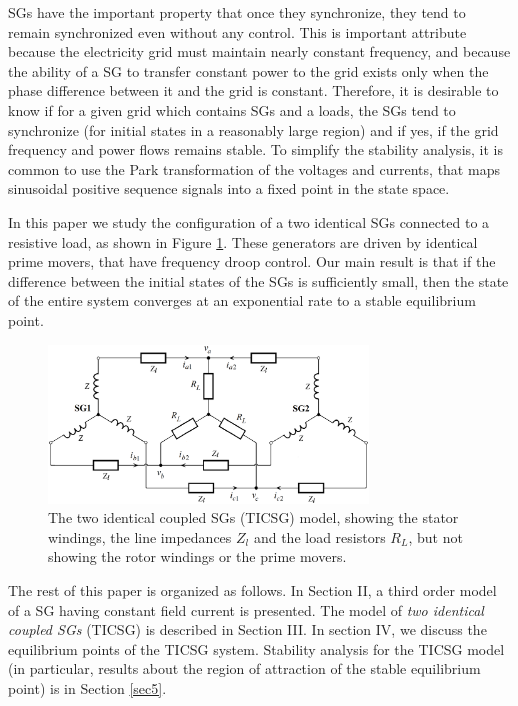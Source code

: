 \documentclass[letterpaper, 10 pt, conference]{ieeeconf}
\begin{document}
SGs have the important property that once they synchronize, they tend
to remain synchronized even without any control. This is important
attribute because the electricity grid must maintain nearly constant
frequency, and because the ability of a SG to transfer constant power
to the grid exists only when the phase difference between it and the
grid is constant. Therefore, it is desirable to know if for a given
grid which contains SGs and a loads, the SGs tend to synchronize (for
initial states in a reasonably large region) and if yes, if the grid
frequency and power flows remains stable. To simplify the stability
analysis, it is common to use the Park transformation of the voltages
and currents, that maps sinusoidal positive sequence signals into a
fixed point in the state space.

In this paper we study the configuration of a two identical SGs
connected to a resistive load, as shown in Figure
\ref{fig:TICSGThreePhase}. These generators are driven by identical
prime movers, that have frequency droop control. Our main result is
that if the difference between the initial states of the SGs is
sufficiently small, then the state of the entire system converges at
an exponential rate to a stable equilibrium point.

\begin{figure} %
\centering \includegraphics[width=8.5cm]{full_circuit_with_2_SGs}
\caption{The two identical coupled SGs (TICSG) model, showing the 
stator windings, the line impedances $Z_l$ and the load resistors 
$R_L$, but not showing the rotor windings or the prime movers.}
\label{fig:TICSGThreePhase}
\end{figure}

The rest of this paper is organized as follows. In Section II, a
third order model of a SG having constant field current is presented.
The model of {\em two identical coupled SGs} (TICSG) is described in 
Section III. In section IV, we discuss the equilibrium points of the 
TICSG system. Stability analysis for the TICSG model (in particular, 
results about the region of attraction of the stable equilibrium 
point) is in Section \ref{sec5}.
\end{document}
